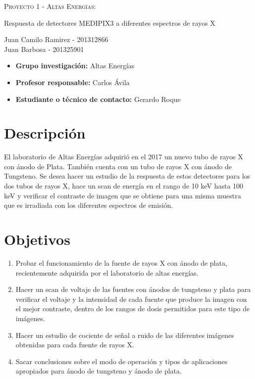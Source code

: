 \documentclass{article}
\begin{document}
	\begin{center}
		\scshape
		\LARGE	
		Proyecto 1 - Altas Energ\'ias:\\
		
		\vspace{1cm}
		
		Respuesta de detectores MEDIPIX3 a diferentes espectros de 
		rayos X
		
		\vspace{0.5cm}
		\normalsize
		
		Juan Camilo Ramirez - 201312866 \\
		Juan Barbosa - 201325901
	\end{center}
	
	\begin{itemize}
		\item \textbf{Grupo investigaci\'on:} Altas Energ\'ias
		\item \textbf{Profesor responsable:} Carlos \'Avila
		\item \textbf{Estudiante o t\'ecnico de contacto:} Gerardo Roque
	\end{itemize}
	
	\section{Descripci\'on}
	El laboratorio de Altas Energías adquirió en el 2017 un nuevo tubo de rayos X con ánodo de Plata. También cuenta con un tubo de rayos X con ánodo de Tungsteno. Se desea hacer un estudio de la respuesta de estos detectores para los dos tubos de rayos X, hace un scan de energía en el rango de 10 keV hasta 100 keV y verificar el contraste de imagen que se obtiene para una misma muestra que es irradiada con los diferentes espectros de emisión.
	\section{Objetivos}
		\begin{enumerate}
			\item Probar el funcionamiento de la fuente de rayos X con ánodo de plata, recientemente adquirida por el laboratorio de altas energías.
			
			\item Hacer un scan de voltaje de las fuentes con ánodos de tungsteno y plata para verificar el voltaje y la intensidad de cada fuente que produce la imagen con el mejor contraste, dentro de los rangos de dosis permitidos para este tipo de imágenes.
			
			\item Hacer un estudio de cociente de señal  a ruido de las diferentes imágenes obtenidas para cada fuente de rayos X.
			
			\item Sacar conclusiones sobre el modo de operación y tipos de aplicaciones apropiados para ánodo de tungsteno y ánodo de plata.
		\end{enumerate}
\end{document}
